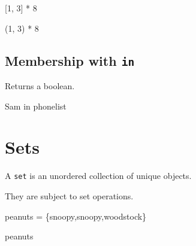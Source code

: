 \documentclass[
  letterpaper,
  DIV=11,
  numbers=noendperiod]{scrreprt}
\newenvironment{Shaded}{\begin{snugshade}}{\end{snugshade}}
\newcommand{\CommentTok}[1]{\textcolor[rgb]{0.37,0.37,0.37}{#1}}
\newcommand{\DecValTok}[1]{\textcolor[rgb]{0.68,0.00,0.00}{#1}}
\newcommand{\KeywordTok}[1]{\textcolor[rgb]{0.00,0.23,0.31}{#1}}
\newcommand{\NormalTok}[1]{\textcolor[rgb]{0.00,0.23,0.31}{#1}}
\newcommand{\OperatorTok}[1]{\textcolor[rgb]{0.37,0.37,0.37}{#1}}
\newcommand{\StringTok}[1]{\textcolor[rgb]{0.13,0.47,0.30}{#1}}
\begin{document}
\begin{Shaded}
\begin{Highlighting}[]
\NormalTok{[}\DecValTok{1}\NormalTok{, }\DecValTok{3}\NormalTok{] }\OperatorTok{*} \DecValTok{8}
\end{Highlighting}
\end{Shaded}

\begin{Shaded}
\begin{Highlighting}[]
\NormalTok{(}\DecValTok{1}\NormalTok{, }\DecValTok{3}\NormalTok{) }\OperatorTok{*} \DecValTok{8}
\end{Highlighting}
\end{Shaded}

\hypertarget{membership-with-in}{%
\section{\texorpdfstring{Membership with
\texttt{in}}{Membership with in}}\label{membership-with-in}}

Returns a boolean.

\begin{Shaded}
\begin{Highlighting}[]
\CommentTok{\textquotesingle{}Sam\textquotesingle{}} \KeywordTok{in}\NormalTok{ phonelist}
\end{Highlighting}
\end{Shaded}

\hypertarget{sets}{%
\chapter{Sets}\label{sets}}

A \texttt{set} is an unordered collection of unique objects.

They are subject to set operations.

\begin{Shaded}
\begin{Highlighting}[]
\NormalTok{peanuts }\OperatorTok{=}\NormalTok{ \{}\StringTok{\textquotesingle{}snoopy\textquotesingle{}}\NormalTok{,}\StringTok{\textquotesingle{}snoopy\textquotesingle{}}\NormalTok{,}\StringTok{\textquotesingle{}woodstock\textquotesingle{}}\NormalTok{\}}
\end{Highlighting}
\end{Shaded}

\begin{Shaded}
\begin{Highlighting}[]
\NormalTok{peanuts}
\end{Highlighting}
\end{Shaded}
\end{document}
